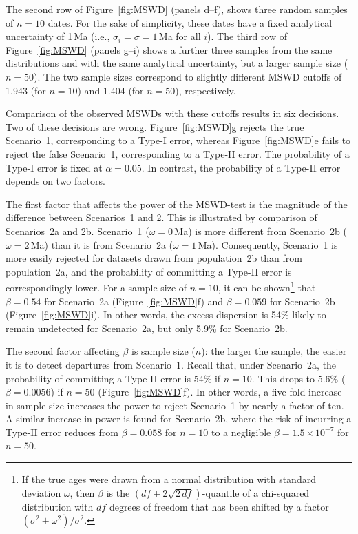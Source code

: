 \documentclass{article}
\begin{document}
The second row of Figure~\ref{fig:MSWD} (panels d--f), shows three
random samples of $n=10$ dates. For the sake of simplicity, these
dates have a fixed analytical uncertainty of 1\,Ma (i.e.,
$\sigma_i=\sigma=1$\,Ma for all $i$). The third row of
Figure~\ref{fig:MSWD} (panels g--i) shows a further three samples from
the same distributions and with the same analytical uncertainty, but a
larger sample size ($n=50$). The two sample sizes correspond to
slightly different MSWD cutoffs of 1.943 (for $n=10$) and 1.404 (for
$n=50$), respectively.

Comparison of the observed MSWDs with these cutoffs results in six
decisions.  Two of these decisions are wrong. Figure~\ref{fig:MSWD}g
rejects the true Scenario~1, corresponding to a Type-I error, whereas
Figure~\ref{fig:MSWD}e fails to reject the false Scenario~1,
corresponding to a Type-II error. The probability of a Type-I error is
fixed at $\alpha=0.05$. In contrast, the probability of a Type-II
error depends on two factors.

The first factor that affects the power of the MSWD-test is the
magnitude of the difference between Scenarios~1 and 2. This is
illustrated by comparison of Scenarios~2a and 2b. Scenario~1
($\omega=0$\,Ma) is more different from Scenario~2b ($\omega=2$\,Ma)
than it is from Scenario~2a ($\omega=1$\,Ma). Consequently, Scenario~1
is more easily rejected for datasets drawn from population~2b than
from population~2a, and the probability of committing a Type-II error
is correspondingly lower. For a sample size of $n=10$, it can be
shown\footnote{If the true ages were drawn from a normal distribution
with standard deviation $\omega$, then $\beta$ is the
$(d\!f+2\sqrt{2\,d\!f})$-quantile of a chi-squared distribution with
$df$ degrees of freedom that has been shifted by a factor
$(\sigma^2+\omega^2)/\sigma^2$.} that $\beta=0.54$ for Scenario~2a
(Figure~\ref{fig:MSWD}f) and $\beta=0.059$ for Scenario~2b
(Figure~\ref{fig:MSWD}i). In other words, the excess dispersion is
54\% likely to remain undetected for Scenario~2a, but only 5.9\% for
Scenario~2b.

The second factor affecting $\beta$ is sample size ($n$): the larger
the sample, the easier it is to detect departures from
Scenario~1. Recall that, under Scenario~2a, the probability of
committing a Type-II error is 54\% if $n=10$. This drops to 5.6\%
($\beta=0.0056$) if $n=50$ (Figure~\ref{fig:MSWD}f). In other words, a
five-fold increase in sample size increases the power to reject
Scenario~1 by nearly a factor of ten. A similar increase in power is
found for Scenario~2b, where the risk of incurring a Type-II error
reduces from $\beta=0.058$ for $n=10$ to a negligible
$\beta=1.5\times{10}^{-7}$ for $n=50$.
\end{document}
